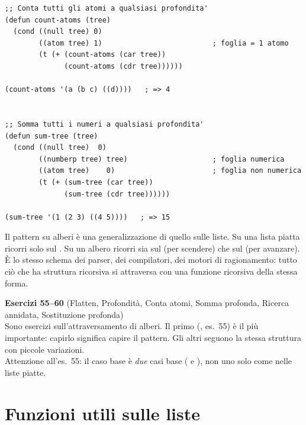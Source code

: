 \begin{esempio}
\begin{lstlisting}
;; Conta tutti gli atomi a qualsiasi profondita'
(defun count-atoms (tree)
  (cond ((null tree) 0)
        ((atom tree) 1)                          ; foglia = 1 atomo
        (t (+ (count-atoms (car tree))
              (count-atoms (cdr tree))))))

(count-atoms '(a (b c) ((d))))   ; => 4


;; Somma tutti i numeri a qualsiasi profondita'
(defun sum-tree (tree)
  (cond ((null tree)  0)
        ((numberp tree) tree)                    ; foglia numerica
        ((atom tree)    0)                       ; foglia non numerica
        (t (+ (sum-tree (car tree))
              (sum-tree (cdr tree))))))

(sum-tree '(1 (2 3) ((4 5))))   ; => 15
\end{lstlisting}
\end{esempio}

\begin{intuizione}
Il pattern su alberi è una generalizzazione di quello sulle liste.
Su una lista piatta ricorri solo sul .
Su un albero ricorri sia sul  (per scendere) che sul 
(per avanzare). È lo stesso schema dei parser, dei compilatori,
dei motori di ragionamento: tutto ciò che ha struttura ricorsiva si
attraversa con una funzione ricorsiva della stessa forma.
\end{intuizione}

\begin{workbook}
\textbf{Esercizi 55--60}
(Flatten, Profondità, Conta atomi, Somma profonda,
Ricerca annidata, Sostituzione profonda)\\[4pt]
Sono esercizi sull'attraversamento di alberi. Il primo (,
es.~55) è il più importante: capirlo significa capire il pattern.
Gli altri seguono la stessa struttura con piccole variazioni.\\[4pt]
Attenzione all'es.~55: il caso base è \emph{due} casi base
( e ), non uno solo come nelle liste piatte.
\end{workbook}

\section{Funzioni utili sulle liste}

